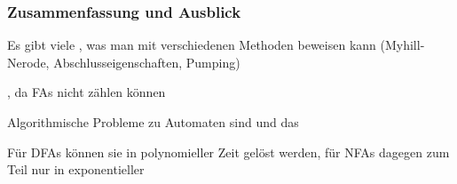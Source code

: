 \documentclass[onlymath]{beamer}
\begin{document}
\begin{frame}\frametitle{Zusammenfassung und Ausblick}

Es gibt viele , was man mit verschiedenen Methoden beweisen kann (Myhill-Nerode, Abschlusseigenschaften, Pumping)
\bigskip

, da FAs nicht zählen können
\bigskip

Algorithmische Probleme zu Automaten sind  und das 
\bigskip

Für DFAs können sie in polynomieller Zeit gelöst werden, für NFAs dagegen zum Teil nur in exponentieller


\end{frame}
\end{document}
